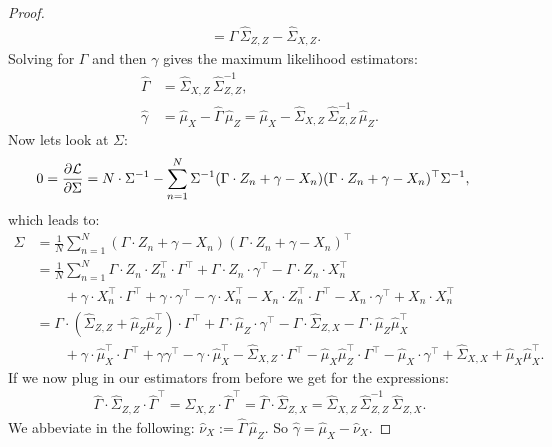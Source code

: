 \begin{Lem}
\begin{proof}
\begin{align*}
       &= \Gamma\, \hat \Sigma_{Z,Z} - \hat \Sigma_{X,Z}.
 \end{align*}
Solving for $\Gamma$ and then $\gamma$ gives the maximum likelihood estimators:
\begin{align*}
    \hat\Gamma & = \hat\Sigma_{X,Z} \,\hat\Sigma_{Z,Z}^{-1}, \\
    \hat\gamma & = \hat \mu_X - \hat\Gamma\,\hat\mu_Z = \hat \mu_X - \hat\Sigma_{X,Z} \,\hat\Sigma_{Z,Z}^{-1}\,\hat\mu_Z.
\end{align*}
Now lets look at $\Sigma$:
\begin{align*}
    0 = \frac{\partial \mathcal{L}}{\partial\Sigma} & = N \cdot \Sigma^{-1} - \sum_{n=1}^N  \Sigma^{-1} (\Gamma \cdot Z_n + \gamma - X_n)(\Gamma \cdot Z_n + \gamma - X_n)^\top \Sigma^{-1},
 \end{align*}
which leads to:
\begin{align*}
    \Sigma &= \frac{1}{N} \sum_{n=1}^N  (\Gamma \cdot Z_n + \gamma - X_n)(\Gamma \cdot Z_n + \gamma - X_n)^\top \\
           &= \frac{1}{N} \sum_{n=1}^N  \Gamma \cdot Z_n \cdot Z_n^\top \cdot \Gamma^\top + \Gamma \cdot Z_n \cdot \gamma^\top - 
           \Gamma \cdot Z_n \cdot X_n^\top \\ 
          &\qquad + \gamma \cdot X_n^\top \cdot \Gamma^\top + \gamma \cdot \gamma^\top - \gamma \cdot X_n^\top   
           - X_n \cdot Z_n^\top \cdot \Gamma^\top - X_n \cdot \gamma^\top + X_n \cdot X_n^\top  \\
          &= \Gamma \cdot ( \hat\Sigma_{Z,Z} + \hat\mu_Z \hat\mu_Z^\top) \cdot \Gamma^\top + \Gamma \cdot \hat\mu_Z\cdot\gamma^\top
          - \Gamma \cdot \hat\Sigma_{Z,X} - \Gamma \cdot \hat\mu_Z\hat\mu_X^\top \\
          &\qquad + \gamma \cdot \hat\mu_X^\top \cdot \Gamma^\top + \gamma \gamma^\top - \gamma \cdot \hat\mu_X^\top
          - \hat\Sigma_{X,Z} \cdot \Gamma^\top - \hat\mu_X\hat\mu_Z^\top \cdot \Gamma^\top 
          - \hat\mu_X \cdot \gamma^\top + \hat\Sigma_{X,X} + \hat\mu_X\hat\mu_X^\top.
 \end{align*}
If we now plug in our estimators from before we get for the expressions:
\begin{align*}
 \hat\Gamma\cdot\hat\Sigma_{Z,Z}\cdot\hat\Gamma^\top = \hat\Sigma_{X,Z}\cdot\hat\Gamma^\top = \hat\Gamma\cdot\hat\Sigma_{Z,X}
 = \hat\Sigma_{X,Z}\,\hat\Sigma_{Z,Z}^{-1}\,\hat\Sigma_{Z,X}. 
\end{align*}
We abbeviate in the following: $\hat \nu_X := \hat\Gamma\,\hat\mu_Z$. So $\hat \gamma = \hat\mu_X - \hat\nu_X$.

\end{proof}
\end{Lem}
